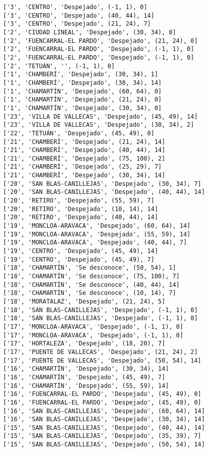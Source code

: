 \documentclass[11pt]{article}
\begin{document}
\begin{Verbatim}[commandchars=\\\{\}]
['3', 'CENTRO', 'Despejado', (-1, 1), 0]
['3', 'CENTRO', 'Despejado', (40, 44), 14]
['3', 'CENTRO', 'Despejado', (21, 24), 7]
['2', 'CIUDAD LINEAL', 'Despejado', (30, 34), 0]
['2', 'FUENCARRAL-EL PARDO', 'Despejado', (21, 24), 0]
['2', 'FUENCARRAL-EL PARDO', 'Despejado', (-1, 1), 0]
['2', 'FUENCARRAL-EL PARDO', 'Despejado', (-1, 1), 0]
['2', 'TETUÁN', '', (-1, 1), 0]
['1', 'CHAMBERÍ', 'Despejado', (30, 34), 1]
['1', 'CHAMBERÍ', 'Despejado', (30, 34), 14]
['1', 'CHAMARTÍN', 'Despejado', (60, 64), 0]
['1', 'CHAMARTÍN', 'Despejado', (21, 24), 0]
['1', 'CHAMARTÍN', 'Despejado', (30, 34), 0]
['23', 'VILLA DE VALLECAS', 'Despejado', (45, 49), 14]
['23', 'VILLA DE VALLECAS', 'Despejado', (30, 34), 2]
['22', 'TETUÁN', 'Despejado', (45, 49), 0]
['21', 'CHAMBERÍ', 'Despejado', (21, 24), 14]
['21', 'CHAMBERÍ', 'Despejado', (40, 44), 14]
['21', 'CHAMBERÍ', 'Despejado', (75, 100), 2]
['21', 'CHAMBERÍ', 'Despejado', (25, 29), 7]
['21', 'CHAMBERÍ', 'Despejado', (30, 34), 14]
['20', 'SAN BLAS-CANILLEJAS', 'Despejado', (30, 34), 7]
['20', 'SAN BLAS-CANILLEJAS', 'Despejado', (40, 44), 14]
['20', 'RETIRO', 'Despejado', (55, 59), 7]
['20', 'RETIRO', 'Despejado', (10, 14), 14]
['20', 'RETIRO', 'Despejado', (40, 44), 14]
['19', 'MONCLOA-ARAVACA', 'Despejado', (60, 64), 14]
['19', 'MONCLOA-ARAVACA', 'Despejado', (55, 59), 14]
['19', 'MONCLOA-ARAVACA', 'Despejado', (40, 44), 7]
['19', 'CENTRO', 'Despejado', (45, 49), 14]
['19', 'CENTRO', 'Despejado', (45, 49), 7]
['18', 'CHAMARTÍN', 'Se desconoce', (50, 54), 1]
['18', 'CHAMARTÍN', 'Se desconoce', (75, 100), 7]
['18', 'CHAMARTÍN', 'Se desconoce', (40, 44), 14]
['18', 'CHAMARTÍN', 'Se desconoce', (10, 14), 7]
['18', 'MORATALAZ', 'Despejado', (21, 24), 5]
['18', 'SAN BLAS-CANILLEJAS', 'Despejado', (-1, 1), 0]
['18', 'SAN BLAS-CANILLEJAS', 'Despejado', (-1, 1), 0]
['17', 'MONCLOA-ARAVACA', 'Despejado', (-1, 1), 0]
['17', 'MONCLOA-ARAVACA', 'Despejado', (-1, 1), 0]
['17', 'HORTALEZA', 'Despejado', (18, 20), 7]
['17', 'PUENTE DE VALLECAS', 'Despejado', (21, 24), 2]
['17', 'PUENTE DE VALLECAS', 'Despejado', (50, 54), 14]
['16', 'CHAMARTÍN', 'Despejado', (30, 34), 14]
['16', 'CHAMARTÍN', 'Despejado', (45, 49), 7]
['16', 'CHAMARTÍN', 'Despejado', (55, 59), 14]
['16', 'FUENCARRAL-EL PARDO', 'Despejado', (45, 49), 0]
['16', 'FUENCARRAL-EL PARDO', 'Despejado', (45, 49), 0]
['16', 'SAN BLAS-CANILLEJAS', 'Despejado', (60, 64), 14]
['16', 'SAN BLAS-CANILLEJAS', 'Despejado', (30, 34), 14]
['15', 'SAN BLAS-CANILLEJAS', 'Despejado', (40, 44), 14]
['15', 'SAN BLAS-CANILLEJAS', 'Despejado', (35, 39), 7]
['15', 'SAN BLAS-CANILLEJAS', 'Despejado', (50, 54), 14]

\end{Verbatim}
\end{document}
